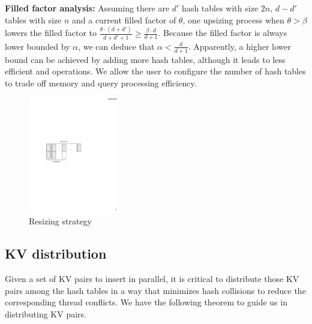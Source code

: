 \vspace{1mm}
\noindent\textbf{Filled factor analysis:}
Assuming there are $d'$ hash tables with size $2n$, $d-d'$ tables with size $n$ and a current filled factor of $\theta$, 
one upsizing process when $\theta > \beta$ lowers the filled factor to $\frac{\theta\cdot(d+d')}{d+d'+1} \geq \frac{\beta \cdot d}{d+1}$.  
Because the filled factor is always lower bounded by $\alpha$, we can deduce that $\alpha < \frac{d}{d+1}$.
Apparently, a higher lower bound can be achieved by adding more hash tables, although it leads to less efficient  and  operations. 
We allow the user to configure the number of hash tables to trade off memory and query processing efficiency. 

\begin{figure}[t]
	\centering
	\includegraphics[width=0.35\textwidth]{fig/MultiTable.pdf}
	\caption{Resizing strategy}
	\label{fig:example-resize}
\end{figure}
\subsection{KV distribution}\label{sec:dyn:distribute}
Given a set of KV pairs to insert in parallel, it is critical to distribute those KV pairs among the hash tables in a way that minimizes hash collisions to reduce the corresponding thread conflicts. We have the following theorem to guide us in distributing KV pairs. 

